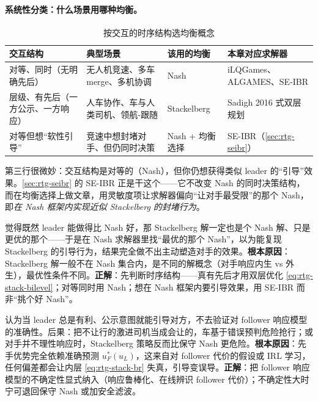 \paragraph{系统性分类：什么场景用哪种均衡。}
\begin{table}[H]\centering\small
\caption{按交互的时序结构选均衡概念}
\label{tab:rtg-concept-pick}
\begin{tabular}{p{} p{} p{} p{}}
\toprule
交互结构 & 典型场景 & 该用的均衡 & 本章对应求解器 \\
\midrule
对等、同时（无明确先后） & 无人机竞速、多车 merge、多机协调 & Nash & iLQGames、ALGAMES、SE-IBR \\
层级、有先后（一方公示、一方响应） & 人车协作、车与人类司机、领航-跟随 & Stackelberg & Sadigh 2016 式双层规划 \\
对等但想“软性引导” & 竞速中想封堵对手、但仍同时决策 & Nash + 均衡选择 & SE-IBR（\cref{sec:rtg-seibr}） \\
\bottomrule
\end{tabular}
\end{table}

\noindent 第三行很微妙：交互结构是对等的（Nash），但你仍想获得类似 leader 的“引导”效果。\cref{sec:rtg-seibr} 的 SE-IBR 正是干这个——它不改变 Nash 的同时决策结构，而在均衡选择上做文章，用灵敏度项让求解器偏向“让对手最受限”的那个 Nash，即\emph{在 Nash 框架内实现近似 Stackelberg 的封堵行为}。

\begin{pitfall}
觉得既然 leader 能做得比 Nash 好，那 Stackelberg 解一定也是个 Nash 解、只是更优的那个——于是在 Nash 求解器里找“最优的那个 Nash”，以为能复现 Stackelberg 的引导行为，结果完全做不出主动塑造对手的效果。\textbf{根本原因}：Stackelberg 解一般不在 Nash 集合内，是不同的解概念（对手响应内生 vs 外生），最优性条件不同。\textbf{正解}：先判断时序结构——真有先后才用双层优化 \cref{eq:rtg-stack-bilevel}；对等同时用 Nash；想在 Nash 框架内要引导效果，用 SE-IBR 而非“挑个好 Nash”。
\end{pitfall}

\begin{pitfall}
认为当 leader 总是有利、公示意图就能引导对方，不去验证对 follower 响应模型的准确性。后果：把不让行的激进司机当成会让的，车基于错误预判危险抢行；或对手并不理性响应时，Stackelberg 策略反而比保守 Nash 更危险。\textbf{根本原因}：先手优势完全依赖准确预测 $u_F^*(u_L)$，这来自对 follower 代价的假设或 IRL 学习，任何偏差都会让内层 \cref{eq:rtg-stack-br} 失真，引导变误导。\textbf{正解}：把 follower 响应模型的不确定性显式纳入（响应鲁棒化、在线辨识 follower 代价）；不确定性大时宁可退回保守 Nash 或加安全滤波。
\end{pitfall}

